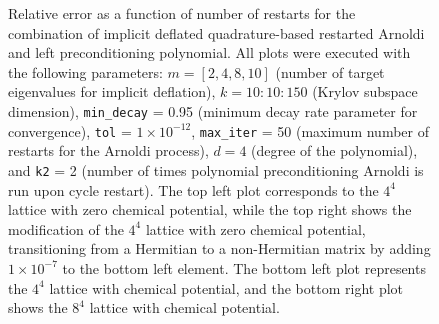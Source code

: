 \begin{figure}[H]
    \caption{\small Relative error as a function of number of restarts for the combination of implicit deflated quadrature-based restarted Arnoldi and left preconditioning polynomial. All plots were executed with the following parameters: $m = [2, 4, 8, 10]$ (number of target eigenvalues for implicit deflation), $k = 10:10:150$ (Krylov subspace dimension), \texttt{min\_decay} = 0.95 (minimum decay rate parameter for convergence), \texttt{tol} = $1 \times 10^{-12}$, \texttt{max\_iter} = 50 (maximum number of restarts for the Arnoldi process), $d = 4$ (degree of the polynomial), and \texttt{k2} = 2 (number of times polynomial preconditioning Arnoldi is run upon cycle restart). The top left plot corresponds to the $4^4$ lattice with zero chemical potential, while the top right shows the modification of the $4^4$ lattice with zero chemical potential, transitioning from a Hermitian to a non-Hermitian matrix by adding $1 \times 10^{-7}$ to the bottom left element. The bottom left plot represents the $4^4$ lattice with chemical potential, and the bottom right plot shows the $8^4$ lattice with chemical potential.}
    \label{fig:combo_imp_rest_arnoldi+left_precond_rest_plot}
\end{figure}

